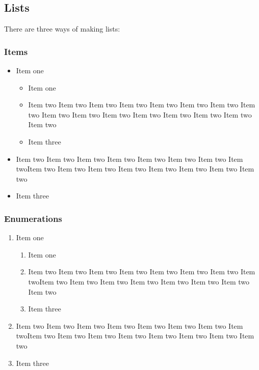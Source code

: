 \subsection{Lists}

There are three ways of making lists:

\subsubsection{Items}

\begin{itemize}
  \item Item one
  \begin{itemize}
    \item Item one
    \item Item two Item two Item two Item two Item two Item two Item
    two Item two
    Item two Item two Item two Item two Item two Item two Item
    two Item two
    \item Item three
  \end{itemize}
  \item Item two Item two Item two Item two Item two Item two Item two
Item twoItem two Item two Item two Item two Item two Item two Item two
Item two
  \item Item three
\end{itemize}

\subsubsection{Enumerations}

\begin{enumerate}
  \item Item one
  \begin{enumerate}
    \item Item one
    \item Item two Item two Item two Item two Item two Item two Item
two Item twoItem two Item two Item two Item two Item two Item two Item
two Item two
    \item Item three
  \end{enumerate}
  \item Item two Item two Item two Item two Item two Item two Item two
Item twoItem two Item two Item two Item two Item two Item two Item two
Item two
  \item Item three
\end{enumerate}

